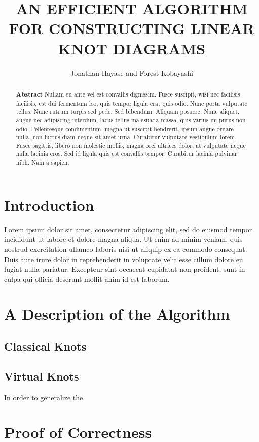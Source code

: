 \documentclass{fkpaper}
\title{AN EFFICIENT ALGORITHM FOR CONSTRUCTING LINEAR KNOT DIAGRAMS}
\author{Jonathan Hayase and Forest Kobayashi}
\affiliation{Department of Mathematics, Harvey Mudd College,
  Claremont, CA, 91711}
\begin{document}



\begin{abstract}
  \textbf{Abstract} Nullam eu ante vel est convallis dignissim. Fusce
  suscipit, wisi nec facilisis facilisis, est dui fermentum leo, quis
  tempor ligula erat quis odio. Nunc porta vulputate tellus. Nunc
  rutrum turpis sed pede. Sed bibendum. Aliquam posuere. Nunc aliquet,
  augue nec adipiscing interdum, lacus tellus malesuada massa, quis
  varius mi purus non odio. Pellentesque condimentum, magna ut
  suscipit hendrerit, ipsum augue ornare nulla, non luctus diam neque
  sit amet urna. Curabitur vulputate vestibulum lorem. Fusce sagittis,
  libero non molestie mollis, magna orci ultrices dolor, at vulputate
  neque nulla lacinia eros. Sed id ligula quis est convallis tempor.
  Curabitur lacinia pulvinar nibh. Nam a sapien.
\end{abstract}


\begin{multicols}{2}
  \section{Introduction}
  Lorem ipsum dolor sit amet, consectetur adipiscing elit, sed do
  eiusmod tempor incididunt ut labore et dolore magna aliqua. Ut enim
  ad minim veniam, quis nostrud exercitation ullamco laboris nisi ut
  aliquip ex ea commodo consequat. Duis aute irure dolor in
  reprehenderit in voluptate velit esse cillum dolore eu fugiat nulla
  pariatur. Excepteur sint occaecat cupidatat non proident, sunt in
  culpa qui officia deserunt mollit anim id est laborum.


  \section{A Description of the Algorithm}
  \subsection{Classical Knots}

  \subsection{Virtual Knots}
  In order to generalize the



  \section{Proof of Correctness}


\end{multicols}




\nocite{*}
\end{document}
